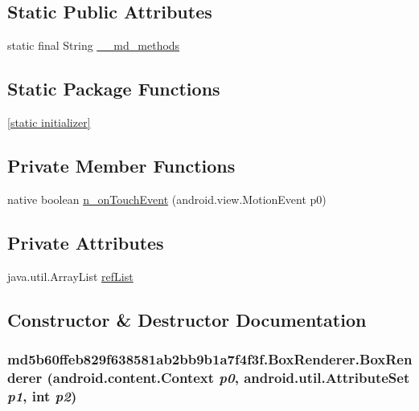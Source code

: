 \subsection*{Static Public Attributes}
\begin{CompactItemize}
\item 
static final String \hyperlink{classmd5b60ffeb829f638581ab2bb9b1a7f4f3f_1_1_box_renderer_5d93612d5b0a73e4f90ab9f50db54f92}{\_\-\_\-md\_\-methods}
\end{CompactItemize}
\subsection*{Static Package Functions}
\begin{CompactItemize}
\item 
\hyperlink{classmd5b60ffeb829f638581ab2bb9b1a7f4f3f_1_1_box_renderer_f97ff50dfcff9831850ece527ffb8a87}{\mbox{[}static initializer\mbox{]}}
\end{CompactItemize}
\subsection*{Private Member Functions}
\begin{CompactItemize}
\item 
native boolean \hyperlink{classmd5b60ffeb829f638581ab2bb9b1a7f4f3f_1_1_box_renderer_532fa996338f3b4215d83e4573b83166}{n\_\-onTouchEvent} (android.view.MotionEvent p0)
\end{CompactItemize}
\subsection*{Private Attributes}
\begin{CompactItemize}
\item 
java.util.ArrayList \hyperlink{classmd5b60ffeb829f638581ab2bb9b1a7f4f3f_1_1_box_renderer_a0eecfeb6a77a84fb7b0b7562f7b7d6e}{refList}
\end{CompactItemize}


\subsection{Constructor \& Destructor Documentation}
\hypertarget{classmd5b60ffeb829f638581ab2bb9b1a7f4f3f_1_1_box_renderer_ed7df0c4a87dc8a3d6e9de801d7dc37a}{
\subsubsection[{BoxRenderer}]{\setlength{\rightskip}{0pt plus 5cm}md5b60ffeb829f638581ab2bb9b1a7f4f3f.BoxRenderer.BoxRenderer (android.content.Context {\em p0}, \/  android.util.AttributeSet {\em p1}, \/  int {\em p2})}}
\label{classmd5b60ffeb829f638581ab2bb9b1a7f4f3f_1_1_box_renderer_ed7df0c4a87dc8a3d6e9de801d7dc37a}


